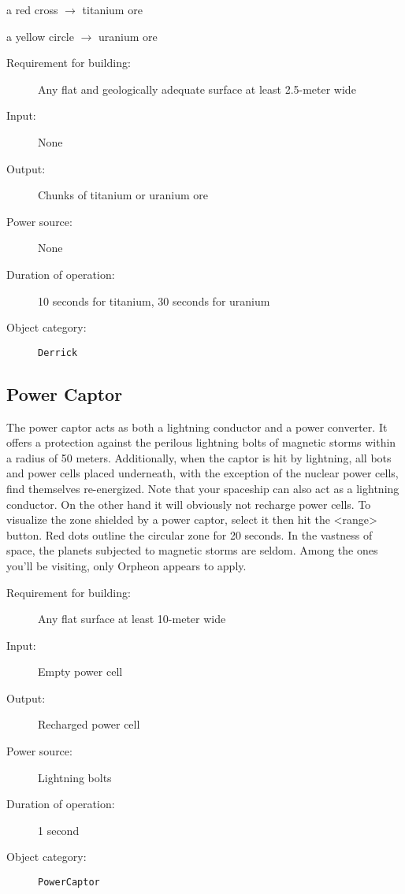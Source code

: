 a red cross $\rightarrow$ titanium ore

a yellow circle $\rightarrow$ uranium ore

\begin{description}
    \item[Requirement for building:] Any flat and geologically adequate surface at least 2.5-meter wide
    \item[Input:] None
    \item[Output:] Chunks of titanium or uranium ore
    \item[Power source:] None
    \item[Duration of operation:] 10 seconds for titanium, 30 seconds for uranium
    \item[Object category:] \texttt{Derrick}
\end{description}


\subsection{Power Captor}

The power captor acts as both a lightning conductor and a power converter. It offers a protection against the perilous lightning bolts of magnetic storms within a radius of 50 meters. Additionally, when the captor is hit by lightning, all bots and power cells placed underneath, with the exception of the nuclear power cells, find themselves re-energized. Note that your spaceship can also act as a lightning conductor. On the other hand it will obviously not recharge power cells. To visualize the zone shielded by a power captor, select it then hit the <range> button. Red dots outline the circular zone for 20 seconds. In the vastness of space, the planets subjected to magnetic storms are seldom. Among the ones you'll be visiting, only Orpheon appears to apply.

\begin{description}
    \item[Requirement for building:] Any flat surface at least 10-meter wide
    \item[Input:] Empty power cell
    \item[Output:] Recharged power cell
    \item[Power source:] Lightning bolts
    \item[Duration of operation:] 1 second
    \item[Object category:] \texttt{PowerCaptor}
\end{description}


